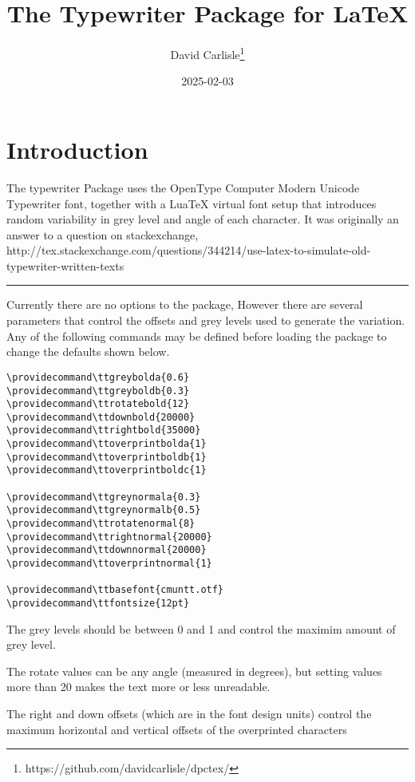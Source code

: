 \documentclass{article}
\begin{document}
\title{The Typewriter Package for LaTeX}
\author{David Carlisle\thanks{https://github.com/davidcarlisle/dpctex/}}
\date{2025-02-03}

\maketitle

\section{Introduction}
The typewriter Package uses the OpenType Computer Modern Unicode
Typewriter font, together with a LuaTeX virtual font setup that
introduces random variability in grey level and angle of each
character. It was originally an answer to a question on stackexchange,
http://tex.stackexchange.com/questions/344214/use-latex-to-simulate-old-typewriter-written-texts


\hrule

Currently there are no options to the package, However there are several parameters that control the offsets
and grey levels used to generate the variation. Any of the following
commands may be defined before loading the package to change the defaults shown below.

\begin{verbatim}
\providecommand\ttgreybolda{0.6}
\providecommand\ttgreyboldb{0.3}
\providecommand\ttrotatebold{12}
\providecommand\ttdownbold{20000}
\providecommand\ttrightbold{35000}
\providecommand\ttoverprintbolda{1}
\providecommand\ttoverprintboldb{1}
\providecommand\ttoverprintboldc{1}

\providecommand\ttgreynormala{0.3}
\providecommand\ttgreynormalb{0.5}
\providecommand\ttrotatenormal{8}
\providecommand\ttrightnormal{20000}
\providecommand\ttdownnormal{20000}
\providecommand\ttoverprintnormal{1}

\providecommand\ttbasefont{cmuntt.otf}
\providecommand\ttfontsize{12pt}
\end{verbatim}

The grey levels should be between 0 and 1 and control the maximim
amount of grey level.

The rotate values can be any angle (measured in degrees), but setting
values more than 20 makes the text more or less unreadable.

The right and down offsets (which are in the font design units) control the
maximum horizontal and vertical offsets of the overprinted characters
\end{document}
